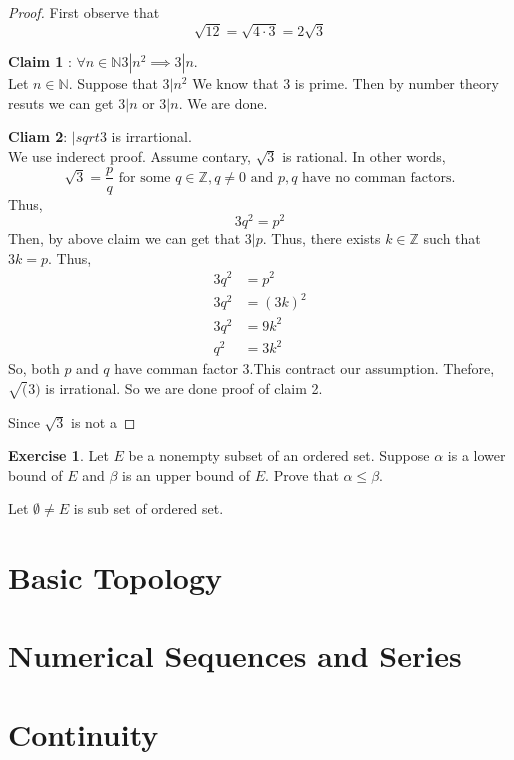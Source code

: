 \documentclass[
]{book}
\theoremstyle{definition}
\theoremstyle{definition}
\theoremstyle{definition}
\newtheorem{exercise}{Exercise}[chapter]
\theoremstyle{definition}
\theoremstyle{remark}
\begin{document}
\begin{proof}
First observe that
\[\sqrt{12}=\sqrt{4\cdot 3}=2\sqrt{3}\]

\textbf{Claim 1} : \(\forall n\in \mathbb{N}3|n^2 \implies 3|n\).\\
Let \(n\in \mathbb{N}\). Suppose that \(3|n^2\) We know that \(3\) is prime. Then by number theory resuts we can get \(3|n\) or \(3|n\).
We are done.

\textbf{Cliam 2}: \(|sqrt{3}\) is irrartional.\\
We use inderect proof. Assume contary, \(\sqrt{3}\) is rational. In other words,
\[\sqrt{3}=\frac{p}{q}\text{  for some } q\in \mathbb{Z} , q\neq 0\text{ and } p,q \text{ have no comman factors.}\]
Thus,\[3q^2=p^2\]
Then, by above claim we can get that \(3|p\). Thus, there exists \(k \in \mathbb{Z}\) such that \(3k=p\).
Thus,
\[
\begin{aligned}
3q^2 &=p^2\\
3q^2 &= (3k)^2\\
3q^2 &= 9k^2\\
q^2  &= 3k^2
\end{aligned}
\]
So, both \(p\) and \(q\) have comman factor 3.This contract our assumption. Thefore, \(\sqrt(3)\) is irrational. So we are done proof of claim 2.

Since \(\sqrt{3}\) is not a
\end{proof}

\begin{exercise}
\protect\hypertarget{exr:unnamed-chunk-4}{}\label{exr:unnamed-chunk-4}Let \(E\) be a nonempty subset of an ordered set. Suppose \(\alpha\) is a lower bound of \(E\) and \(\beta\) is an upper bound of \(E\). Prove that \(\alpha \leq \beta\).
\end{exercise}

Let \(\emptyset \neq E\) is sub set of ordered set.

\chapter{Basic Topology}\label{basic-topology}

\chapter{Numerical Sequences and Series}\label{numerical-sequences-and-series}

\chapter{Continuity}\label{continuity}

  
\end{document}
